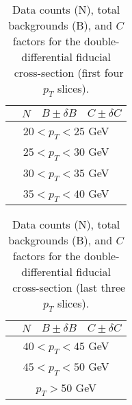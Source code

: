 \begin{table}
\footnotesize
  \begin{center}
\begin{tabular}{lccc}
\hline
    &   $N$   & $B \pm \delta B$  &  $C \pm \delta C$ \\
\hline

\hline
\multicolumn{4}{c}{$20 < p_T < 25$ GeV} \\
\hline


\hline
\multicolumn{4}{c}{$25 < p_T < 30$ GeV} \\
\hline


\hline
\multicolumn{4}{c}{$30 < p_T < 35$ GeV} \\
\hline


\hline
\multicolumn{4}{c}{$35 < p_T < 40$ GeV} \\
\hline


    \hline
    \end{tabular}
    \caption{ Data counts (N), total backgrounds (B), and $C$ factors for the double-differential fiducial \Wmunup\ cross-section (first four $p_T$ slices).}
    \label{tab:Wmn:NBC_POS_2D_pt20_1}
  \end{center}
\end{table}

\begin{table}
\footnotesize
  \begin{center}
\begin{tabular}{lccc}
\hline
    &   $N$   & $B \pm \delta B$  &  $C \pm \delta C$ \\
\hline

\hline
\multicolumn{4}{c}{$40 < p_T < 45$ GeV} \\
\hline


\hline
\multicolumn{4}{c}{$45 < p_T < 50$ GeV} \\
\hline


\hline
\multicolumn{4}{c}{$p_T > 50$ GeV} \\
\hline


    \hline
    \end{tabular}
    \caption{ Data counts (N), total backgrounds (B), and $C$ factors for the double-differential fiducial \Wmunup\ cross-section (last three $p_T$ slices).}
    \label{tab:Wmn:NBC_POS_2D_pt20_2}
  \end{center}
\end{table}

